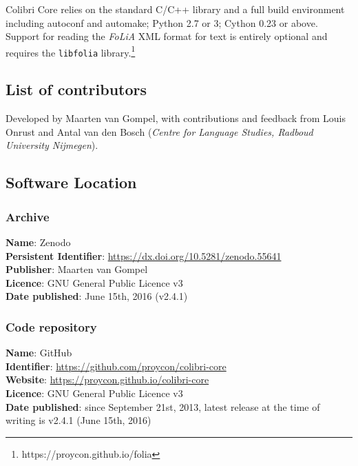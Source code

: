 Colibri Core relies on the standard C/C++ library and a full build environment including autoconf and
automake; Python 2.7 or 3; Cython 0.23 or above. Support for reading the
\emph{FoLiA} XML format for text is entirely optional and requires the \texttt{libfolia}
library.\footnote{https://proycon.github.io/folia}

\subsection*{List of contributors}

Developed by Maarten van Gompel, with contributions and feedback from Louis
Onrust and Antal van den Bosch (\emph{Centre for Language Studies, Radboud
University Nijmegen}).

\subsection*{Software Location}

\subsubsection*{Archive}

\textbf{Name}: Zenodo \\
\textbf{Persistent Identifier}: \url{https://dx.doi.org/10.5281/zenodo.55641} \\
\textbf{Publisher}: Maarten van Gompel \\
\textbf{Licence}: GNU General Public Licence v3 \\
\textbf{Date published}: June 15th, 2016 (v2.4.1) \\

\subsubsection*{Code repository}

\textbf{Name}: GitHub \\
\textbf{Identifier}: \url{https://github.com/proycon/colibri-core} \\
\textbf{Website}: \url{https://proycon.github.io/colibri-core} \\
\textbf{Licence}: GNU General Public Licence v3 \\
\textbf{Date published}: since September 21st, 2013, latest release at the time
of writing is v2.4.1 (June 15th, 2016) \\

